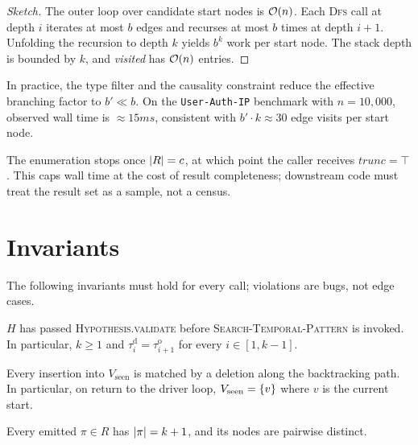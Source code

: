 \documentclass[11pt,openany]{book}
\begin{document}
\begin{proof}[Sketch]
The outer loop over candidate start nodes is $\mathcal{O}(n)$. Each
\textsc{Dfs} call at depth $i$ iterates at most $b$ edges and
recurses at most $b$ times at depth $i+1$. Unfolding the recursion
to depth $k$ yields $b^k$ work per start node. The stack depth is
bounded by $k$, and \emph{visited} has $\mathcal{O}(n)$ entries.
\end{proof}

In practice, the type filter and the causality constraint reduce the
effective branching factor to $b' \ll b$. On the \texttt{User-Auth-IP}
benchmark with $n = 10{,}000$, observed wall time is $\approx 15\unit{ms}$,
consistent with $b' \cdot k \approx 30$ edge visits per start node.

\begin{remark}
The enumeration stops once $\lvert R \rvert = c$, at which point the caller
receives $\mathit{trunc} = \top$. This caps wall time at the cost of
result completeness; downstream code must treat the result set as a
sample, not a census.
\end{remark}

\section{Invariants}
\label{sec:dfs:invariants}

The following invariants must hold for every call; violations are
bugs, not edge cases.

\begin{invariant}
\label{inv:dfs:hypo}
$H$ has passed \textsc{Hypothesis.validate} before
\textsc{Search-Temporal-Pattern} is invoked. In particular,
$k \ge 1$ and $\tau^{\mathrm{d}}_i = \tau^{\mathrm{o}}_{i+1}$ for
every $i \in [1, k-1]$.
\end{invariant}

\begin{invariant}
\label{inv:dfs:visited}
Every insertion into $V_{\mathrm{seen}}$ is matched by a deletion
along the backtracking path. In particular, on return to the driver
loop, $V_{\mathrm{seen}} = \{v\}$ where $v$ is the current start.
\end{invariant}

\begin{invariant}
\label{inv:dfs:path}
Every emitted $\pi \in R$ has $\lvert \pi \rvert = k + 1$, and its nodes are
pairwise distinct.
\end{invariant}
\end{document}
